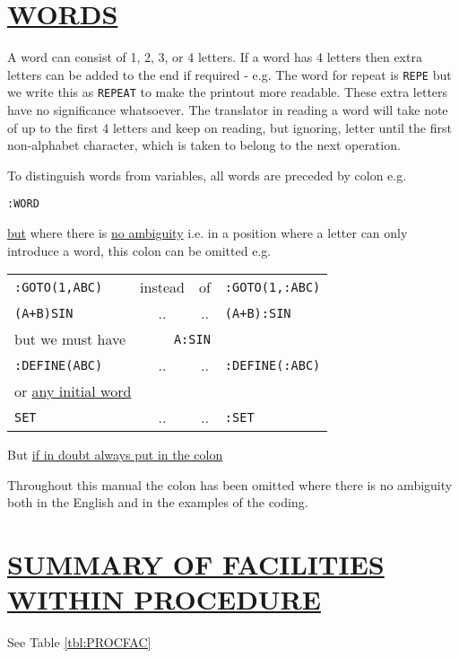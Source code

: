\documentclass[10pt, a4paper, oneside]{article}
\newcommand{\myuline}[1]{\uline{#1}}
\newcommand{\mytt}[1]{\texttt{\scriptsize #1}}
\newcommand{\mytt}[1]{\texttt{\small #1}}
\begin{document}
\begin{multicols}{2}
\section{\myuline{WORDS}}

A word can consist of 1, 2, 3, or 4 letters.  If
a word has 4 letters then extra letters can be added to
the end if required - e.g. The word for repeat is
\mytt{REPE} but we write this as \mytt{REPEAT} to make the printout
more readable.  These extra letters have no significance
whatsoever.  The translator in reading a word will take
note of up to the first 4 letters and keep on reading,
but ignoring, letter until the first non-alphabet
character, which is taken to belong to the next
operation.

To distinguish words from variables, all words are
preceded by colon e.g.

\begin{addmargin}[1cm]{1em}%
\begin{lstlisting}
:WORD
\end{lstlisting}
\end{addmargin}

\begin{flushleft}
\myuline{but} where there is \myuline{no ambiguity} i.e. in a position
where a letter can only introduce a word, this colon
can be omitted e.g.

\begin{tabular}{lccl}
\mytt{:GOTO(1,ABC)} & instead & of & \mytt{:GOTO(1,:ABC)} \\
\mytt{(A+B)SIN} & .. & .. & \mytt{(A+B):SIN} \\
but we must have & \multicolumn{2}{r}{\mytt{A:SIN}} & \\[1ex]
\mytt{:DEFINE(ABC)} & .. & .. & \mytt{:DEFINE(:ABC)} \\[1ex]
\multicolumn{4}{l}{or \myuline{any initial word}} \\[1ex]
\mytt{SET} & .. & .. & \mytt{:SET} \\[1ex]
\end{tabular}

But \myuline{if in doubt always put in the colon}
\end{flushleft}

Throughout this manual the colon has been omitted
where there is no ambiguity both in the English and in
the examples of the coding.


\section{\myuline{SUMMARY OF FACILITIES WITHIN PROCEDURE}}
See Table \ref{tbl:PROCFAC}



\end{multicols}
\end{document}
